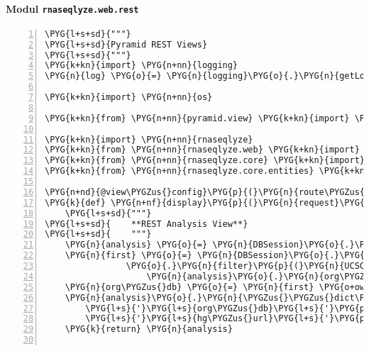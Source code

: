 \paragraph{Modul \texttt{rnaseqlyze.web.rest}}
\label{rnaseqlyze-pdf:modul-rnaseqlyze-web-rest}
\begin{Verbatim}[commandchars=\\\{\},numbers=left,firstnumber=1,stepnumber=5]
\PYG{l+s+sd}{"""}
\PYG{l+s+sd}{Pyramid REST Views}
\PYG{l+s+sd}{"""}
\PYG{k+kn}{import} \PYG{n+nn}{logging}
\PYG{n}{log} \PYG{o}{=} \PYG{n}{logging}\PYG{o}{.}\PYG{n}{getLogger}\PYG{p}{(}\PYG{n}{\PYGZus{}\PYGZus{}name\PYGZus{}\PYGZus{}}\PYG{p}{)}

\PYG{k+kn}{import} \PYG{n+nn}{os}

\PYG{k+kn}{from} \PYG{n+nn}{pyramid.view} \PYG{k+kn}{import} \PYG{n}{view\PYGZus{}config}

\PYG{k+kn}{import} \PYG{n+nn}{rnaseqlyze}
\PYG{k+kn}{from} \PYG{n+nn}{rnaseqlyze.web} \PYG{k+kn}{import} \PYG{n}{DBSession}\PYG{p}{,} \PYG{n}{DBSession\PYGZus{}unmanaged}
\PYG{k+kn}{from} \PYG{n+nn}{rnaseqlyze.core} \PYG{k+kn}{import} \PYG{n}{service}
\PYG{k+kn}{from} \PYG{n+nn}{rnaseqlyze.core.entities} \PYG{k+kn}{import} \PYG{n}{Analysis}\PYG{p}{,} \PYG{n}{StageLog}\PYG{p}{,} \PYG{n}{UCSCOrganism}

\PYG{n+nd}{@view\PYGZus{}config}\PYG{p}{(}\PYG{n}{route\PYGZus{}name}\PYG{o}{=}\PYG{l+s}{'}\PYG{l+s}{analysis\PYGZus{}rest}\PYG{l+s}{'}\PYG{p}{,} \PYG{n}{renderer}\PYG{o}{=}\PYG{l+s}{'}\PYG{l+s}{jsonx}\PYG{l+s}{'}\PYG{p}{)}
\PYG{k}{def} \PYG{n+nf}{display}\PYG{p}{(}\PYG{n}{request}\PYG{p}{)}\PYG{p}{:}
    \PYG{l+s+sd}{"""}
\PYG{l+s+sd}{    **REST Analysis View**}
\PYG{l+s+sd}{    """}
    \PYG{n}{analysis} \PYG{o}{=} \PYG{n}{DBSession}\PYG{o}{.}\PYG{n}{query}\PYG{p}{(}\PYG{n}{Analysis}\PYG{p}{)}\PYG{o}{.}\PYG{n}{get}\PYG{p}{(}\PYG{n+nb}{int}\PYG{p}{(}\PYG{n}{request}\PYG{o}{.}\PYG{n}{matchdict}\PYG{p}{[}\PYG{l+s}{"}\PYG{l+s}{id}\PYG{l+s}{"}\PYG{p}{]}\PYG{p}{)}\PYG{p}{)}
    \PYG{n}{first} \PYG{o}{=} \PYG{n}{DBSession}\PYG{o}{.}\PYG{n}{query}\PYG{p}{(}\PYG{n}{UCSCOrganism}\PYG{p}{)} \PYGZbs{}
                \PYG{o}{.}\PYG{n}{filter}\PYG{p}{(}\PYG{n}{UCSCOrganism}\PYG{o}{.}\PYG{n}{acc}\PYG{o}{.}\PYG{n}{like}\PYG{p}{(}
                    \PYG{n}{analysis}\PYG{o}{.}\PYG{n}{org\PYGZus{}accession} \PYG{o}{+} \PYG{l+s}{'}\PYG{l+s}{\PYGZpc{}}\PYG{l+s}{'}\PYG{p}{)}\PYG{p}{)}\PYG{o}{.}\PYG{n}{first}\PYG{p}{(}\PYG{p}{)}
    \PYG{n}{org\PYGZus{}db} \PYG{o}{=} \PYG{n}{first} \PYG{o+ow}{and} \PYG{n}{first}\PYG{o}{.}\PYG{n}{db}
    \PYG{n}{analysis}\PYG{o}{.}\PYG{n}{\PYGZus{}\PYGZus{}dict\PYGZus{}\PYGZus{}}\PYG{o}{.}\PYG{n}{update}\PYG{p}{(}\PYG{p}{\PYGZob{}}
        \PYG{l+s}{'}\PYG{l+s}{org\PYGZus{}db}\PYG{l+s}{'}\PYG{p}{:} \PYG{n}{org\PYGZus{}db}\PYG{p}{,}
        \PYG{l+s}{'}\PYG{l+s}{hg\PYGZus{}url}\PYG{l+s}{'}\PYG{p}{:} \PYG{n}{analysis}\PYG{o}{.}\PYG{n}{get\PYGZus{}hg\PYGZus{}url}\PYG{p}{(}\PYG{n}{org\PYGZus{}db}\PYG{p}{)}\PYG{p}{\PYGZcb{}}\PYG{p}{)}
    \PYG{k}{return} \PYG{n}{analysis}


\end{Verbatim}
